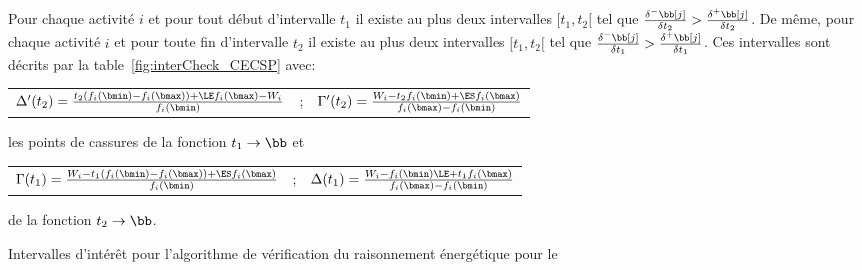\begin{theo}
  Pour chaque activité $i$ et pour tout début d'intervalle $t_1$ il
  existe au plus deux intervalles $[t_1,t_2[$ tel que
  $\frac{\delta^{-}\bb[j]}{\delta t_2} >
  \frac{\delta^{+}\bb[j]}{\delta t_2} $. 
  De même,  pour chaque activité $i$ et pour toute fin d'intervalle $t_2$ il
  existe au plus deux intervalles $[t_1,t_2[$ tel que
  $\frac{\delta^{-}\bb[j]}{\delta t_1} >
  \frac{\delta^{+}\bb[j]}{\delta t_1} $. 
  Ces intervalles sont décrits
  par la table~\ref{fig:interCheck_CECSP} avec:
  \begin{center}
    \begin{tabular}{lcr}
      $\Delta'(t_2)=\frac{t_2(f_i(\bmin)-f_i(\bmax))+\LE f_i(\bmax)-W_i}{f_i(\bmin)}$
      & ;
      &$\Gamma'(t_2)=\frac{W_i-t_2f_i(\bmin)+\ES f_i(\bmax)}{f_i(\bmax)-f_i(\bmin)}$
    \end{tabular}
  \end{center}

les points de cassures de la fonction $t_1 \rightarrow \bb$ et 

\begin{center}
\begin{tabular}{lcr}
  $\Gamma(t_1)=\frac{W_i-t_1(f_i(\bmin)-f_i(\bmax))+\ES f_i(\bmax)}{f_i(\bmin)}$&
  ;
  &$\Delta(t_1)=\frac{W_i-f_i(\bmin)\LE +t_1f_i(\bmax)}{f_i(\bmax)-f_i(\bmin)}$
\end{tabular}
\end{center}

de la fonction $t_2 \rightarrow \bb$.

\begin{table} 
  
  \caption{Intervalles d'intérêt pour l'algorithme de vérification du
    raisonnement énergétique pour le \CECSP}
  \label{fig:interCheck_CECSP}
\end{table}
\end{theo}

